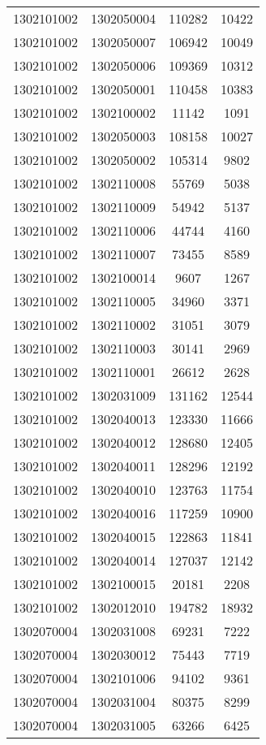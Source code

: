 \begin{longtable}[h]{llcc}
		1302101002 & 1302050004 & 110282 & 10422\\
		1302101002 & 1302050007 & 106942 & 10049\\
		1302101002 & 1302050006 & 109369 & 10312\\
		1302101002 & 1302050001 & 110458 & 10383\\
		1302101002 & 1302100002 & 11142 & 1091\\
		1302101002 & 1302050003 & 108158 & 10027\\
		1302101002 & 1302050002 & 105314 & 9802\\
		1302101002 & 1302110008 & 55769 & 5038\\
		1302101002 & 1302110009 & 54942 & 5137\\
		1302101002 & 1302110006 & 44744 & 4160\\
		1302101002 & 1302110007 & 73455 & 8589\\
		1302101002 & 1302100014 & 9607 & 1267\\
		1302101002 & 1302110005 & 34960 & 3371\\
		1302101002 & 1302110002 & 31051 & 3079\\
		1302101002 & 1302110003 & 30141 & 2969\\
		1302101002 & 1302110001 & 26612 & 2628\\
		1302101002 & 1302031009 & 131162 & 12544\\
		1302101002 & 1302040013 & 123330 & 11666\\
		1302101002 & 1302040012 & 128680 & 12405\\
		1302101002 & 1302040011 & 128296 & 12192\\
		1302101002 & 1302040010 & 123763 & 11754\\
		1302101002 & 1302040016 & 117259 & 10900\\
		1302101002 & 1302040015 & 122863 & 11841\\
		1302101002 & 1302040014 & 127037 & 12142\\
		1302101002 & 1302100015 & 20181 & 2208\\
		1302101002 & 1302012010 & 194782 & 18932\\
		1302070004 & 1302031008 & 69231 & 7222\\
		1302070004 & 1302030012 & 75443 & 7719\\
		1302070004 & 1302101006 & 94102 & 9361\\
		1302070004 & 1302031004 & 80375 & 8299\\
		1302070004 & 1302031005 & 63266 & 6425\\

\end{longtable}

